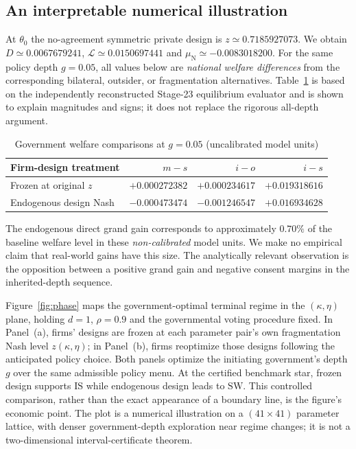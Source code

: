 \documentclass[11pt,a4paper]{article}
\theoremstyle{remark}\newtheorem{remark}[theorem]{Remark}
\newcommand{\SW}{\mathrm{SW}}\newcommand{\SU}{\mathrm{SU}}\newcommand{\IS}{\mathrm{IS}}
\newcommand{\N}{\mathrm{N}}\newcommand{\F}{\mathrm{F}}
\newcommand{\loss}{\mathcal L}\newcommand{\vect}[1]{\boldsymbol{#1}}
\begin{document}
\subsection{An interpretable numerical illustration}
At $\theta_0$ the no-agreement symmetric private design is $z\simeq0.7185927073$. We obtain $D\simeq0.0067679241$, $\loss\simeq0.0150697441$ and $\mu_{\N}\simeq-0.0083018200$. For the same policy depth $g=0.05$, all values below are \emph{national welfare differences} from the corresponding bilateral, outsider, or fragmentation alternatives. Table~\ref{tab:effects} is based on the independently reconstructed Stage-23 equilibrium evaluator and is shown to explain magnitudes and signs; it does not replace the rigorous all-depth argument.
\begin{table}[ht]
\centering\small
\caption{Government welfare comparisons at $g=0.05$ (uncalibrated model units)}\label{tab:effects}
\begin{tabular}{lrrr}
\toprule
Firm-design treatment&$m-s$&$i-o$&$i-s$\\
\midrule
Frozen at original $z$&$+0.000272382$&$+0.000234617$&$+0.019318616$\\
Endogenous design Nash&$-0.000473474$&$-0.001246547$&$+0.016934628$\\
\bottomrule
\end{tabular}
\end{table}
The endogenous direct grand gain corresponds to approximately $0.70\%$ of the baseline welfare level in these \emph{non-calibrated} model units. We make no empirical claim that real-world gains have this size. The analytically relevant observation is the opposition between a positive grand gain and negative consent margins in the inherited-depth sequence.

Figure~\ref{fig:phase} maps the government-optimal terminal regime in the $(\kappa,\eta)$ plane, holding $d=1$, $\rho=0.9$ and the governmental voting procedure fixed. In Panel~(a), firms' designs are frozen at each parameter pair's own fragmentation Nash level $z(\kappa,\eta)$; in Panel~(b), firms reoptimize those designs following the anticipated policy choice. Both panels optimize the initiating government's depth $g$ over the same admissible policy menu. At the certified benchmark star, frozen design supports $\IS$ while endogenous design leads to $\SW$. This controlled comparison, rather than the exact appearance of a boundary line, is the figure's economic point. The plot is a numerical illustration on a $(41\times41)$ parameter lattice, with denser government-depth exploration near regime changes; it is not a two-dimensional interval-certificate theorem.
\end{document}
